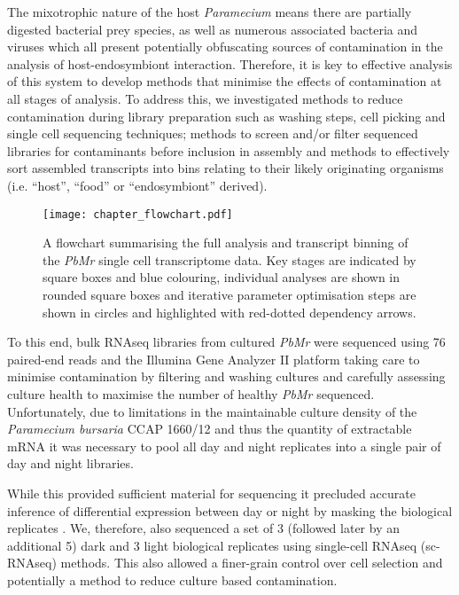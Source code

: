 The mixotrophic nature of the host \textit{Paramecium} \citep{Dolan1992} means there 
are partially digested bacterial prey species, as well as numerous 
associated bacteria \citep{Gortz2009,Fokin2009,Schrallhammer2009} and viruses \citep{VanEtten1983} which
all present potentially obfuscating sources of contamination in the analysis of host-endosymbiont
interaction.  
Therefore, it is key to effective analysis of this system to develop methods
that minimise the effects of contamination at all stages of analysis.  To address this,
we investigated methods to reduce contamination during library preparation such as washing steps, cell picking
and single cell sequencing techniques; methods to screen and/or filter sequenced libraries
for contaminants before inclusion in assembly and methods to effectively sort
assembled transcripts into bins relating to their likely originating organisms
(i.e. ``host'', ``food'' or ``endosymbiont'' derived).


\begin{figure}[h!]
    \texttt{[image: chapter\_flowchart.pdf]}
    \caption[Overview of single cell transcriptome assembly and analysis]{A flowchart summarising the full analysis and transcript binning of the \textit{PbMr} single cell transcriptome data.  Key stages are indicated by square boxes and blue colouring, individual analyses are shown in rounded square boxes and iterative parameter optimisation steps are shown in circles and highlighted with red-dotted dependency arrows.}
\end{figure}

To this end, bulk RNAseq libraries from cultured \textit{PbMr} were sequenced using \SI{76}{\bp} paired-end reads and the Illumina Gene Analyzer II platform 
taking care to minimise contamination by filtering and washing cultures and carefully
assessing culture health to maximise the number of healthy \textit{PbMr} sequenced. 
Unfortunately, due to limitations in the maintainable culture density of the 
\textit{Paramecium bursaria} CCAP 1660/12 and thus the quantity of extractable
mRNA it was necessary to pool all day and night replicates into a single pair of day and night libraries. 

While this provided sufficient material for sequencing it precluded accurate inference of differential expression between day or night
by masking the biological replicates \citep{Auer2010}.
We, therefore, also sequenced a set of 3 (followed later by an additional 5) dark and 3 light
biological replicates using single-cell RNAseq (sc-RNAseq) methods.
This also allowed a finer-grain control over cell selection and potentially
a method to reduce culture based contamination.


